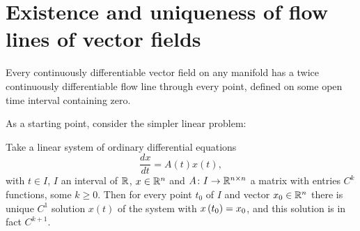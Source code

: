 \section{Existence and uniqueness of flow lines of vector fields}
\begin{theorem}\label{theorem:Picard.manifolds}
Every continuously differentiable vector field on any manifold has a twice continuously differentiable flow line through every point, defined on some open time interval containing zero.
\end{theorem}
As a starting point, consider the simpler linear problem:
\begin{theorem}\label{theorem:linear.Picard}
Take a linear system of ordinary differential equations
\[
\frac{dx}{dt} = A(t) x(t),
\]
with \(t \in I\), \(I\) an interval of \(\mathbb{R}^{}\), \(x \in \mathbb{R}^{n}\) and \(A \colon I \to \mathbb{R}^{n \times n}\) a matrix with entries \(C^k\) functions, some \(k \ge 0\).
Then for every point \(t_0\) of \(I\) and vector \(x_0 \in \mathbb{R}^{n}\) there is unique \(C^1\) solution \(x(t)\) of the system with \(x\left(t_0\right)=x_0\), and this solution is in fact \(C^{k+1}\).
\end{theorem}
